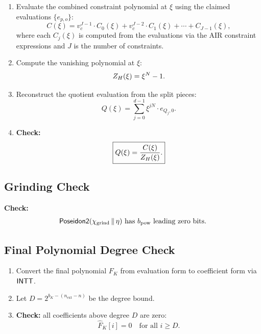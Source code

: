 \begin{enumerate}[label=(\roman*)]
  \item Evaluate the combined constraint polynomial at $\xi$
        using the claimed evaluations $\{e_{p,o}\}$:
        \[
          C(\xi) = v_c^{J-1} \cdot C_0(\xi) + v_c^{J-2} \cdot C_1(\xi)
                   + \cdots + C_{J-1}(\xi),
        \]
        where each $C_j(\xi)$ is computed from the evaluations via the
        AIR constraint expressions and $J$ is the number of constraints.

  \item Compute the vanishing polynomial at $\xi$:
        \[
          Z_H(\xi) = \xi^N - 1.
        \]

  \item Reconstruct the quotient evaluation from the split pieces:
        \begin{equation}
          \label{eq:quotient-reconstruct}
          Q(\xi) = \sum_{j=0}^{d-1} \xi^{jN} \cdot e_{Q_j, 0}.
        \end{equation}

  \item \textbf{Check:}
        \begin{equation}
          \label{eq:constraint-check}
          \boxed{Q(\xi) = \frac{C(\xi)}{Z_H(\xi)}.}
        \end{equation}
\end{enumerate}

\subsection{Grinding Check}
\label{sec:pow-check}

\textbf{Check:}
\[
  \textsf{Poseidon2}(\chi_{\mathrm{grind}} \,\|\, \eta)
  \text{ has } b_{\mathrm{pow}} \text{ leading zero bits}.
\]

\subsection{Final Polynomial Degree Check}
\label{sec:degree-check}

\begin{enumerate}[label=(\roman*)]
  \item Convert the final polynomial $F_K$ from evaluation form to coefficient form
        via $\textsf{INTT}$.

  \item Let $D = 2^{b_K - (n_{\mathrm{ext}} - n)}$ be the degree bound.

  \item \textbf{Check:} all coefficients above degree $D$ are zero:
        \[
          \hat{F}_K[i] = 0 \quad \text{for all } i \geq D.
        \]
\end{enumerate}

